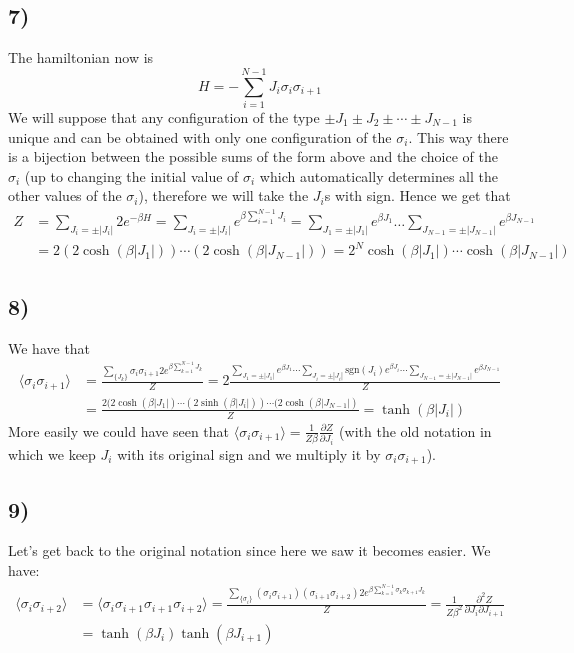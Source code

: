 \documentclass[10pt,a4paper]{book}
\newcommand{\p}{\partial}
\begin{document}
\subsection*{7)}
The hamiltonian now is 
$$H=-\sum_{i=1}^{N-1}J_i\sigma_i\sigma_{i+1}$$
We will suppose that any configuration of the type $\pm J_1\pm J_2\pm\cdots\pm J_{N-1}$ is unique and can be obtained with only one configuration of the $\sigma_i$. This way there is a bijection between the possible sums of the form above and the choice of the $\sigma_i$ (up to changing the initial value of $\sigma_i$ which automatically determines all the other values of the $\sigma_i$), therefore we will take the $J_i$s with sign. Hence we get that
\begin{align*}
Z&=\sum_{J_i=\pm |J_i|} 2e^{-\beta H}=\sum_{J_i=\pm|J_i|}e^{\beta\sum_{i=1}^{N-1}J_i}=\sum_{J_1=\pm|J_1|}e^{\beta J_1}\ldots \sum_{J_{N-1}=\pm|J_{N-1}|}e^{\beta J_{N-1}}\\
&=2(2\cosh(\beta |J_1|))\cdots (2\cosh(\beta |J_{N-1}|))=2^{N}\cosh(\beta |J_1|)\cdots\cosh(\beta |J_{N-1}|)
\end{align*}

\subsection*{8)}
We have that
\begin{align*}
\langle \sigma_i\sigma_{i+1}\rangle &=\frac{\sum_{\{J_k\}}\sigma_i\sigma_{i+1}2e^{\beta\sum_{k=1}^{N-1}J_k}}{Z}=2\frac{\sum_{J_1=\pm|J_1|}e^{\beta J_1}\cdots \sum_{J_i=\pm|J_i|}\text{sgn}(J_i)e^{\beta J_i}\cdots \sum_{J_{N-1}=\pm|J_{N-1}|}e^{\beta J_{N-1}}}{Z}\\
&=\frac{2(2\cosh(\beta |J_1|)\cdots (2\sinh(\beta |J_i|))\cdots (2\cosh(\beta |J_{N-1}|)}{Z}=\tanh(\beta |J_i|)
\end{align*}
More easily we could have seen that $\langle \sigma_i\sigma_{i+1}\rangle =\frac{1}{Z\beta}\frac{\p Z}{\p J_i}$ (with the old notation in which we keep $J_i$ with its original sign and we multiply it by $\sigma_i\sigma_{i+1}$).

\subsection*{9)}
Let's get back to the original notation since here we saw it becomes easier. We have:
\begin{align*}
\langle \sigma_i\sigma_{i+2}\rangle&=\langle \sigma_i\sigma_{i+1}\sigma_{i+1}\sigma_{i+2}\rangle =\frac{\sum_{\{\sigma_i\}}(\sigma_i\sigma_{i+1})(\sigma_{i+1}\sigma_{i+2})2e^{\beta\sum_{k=1}^{N-1}\sigma_k\sigma_{k+1}J_k}}{Z}=\frac{1}{Z\beta^2}\frac{\p^2 Z}{\p J_i\p J_{i+1}}\\
&=\tanh(\beta J_i)\tanh(\beta J_{i+1})
\end{align*}
\end{document}
